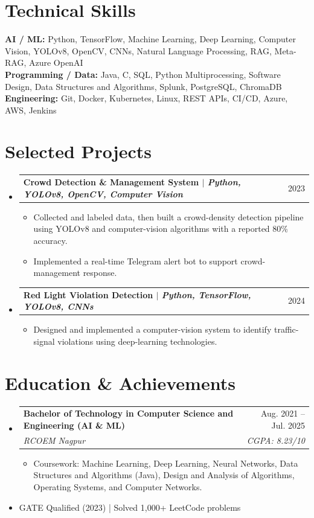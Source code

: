 \documentclass[a4paper,10pt]{article}
\makeatletter
\newcommand{\resumeItem}[1]{\item \small{#1}}
\newcommand{\resumeSubheading}[4]{\item \begin{tabularx}{\textwidth}{@{}Xr@{}}\textbf{#1} & #2 \\ \textit{\small #3} & \textit{\small #4}\end{tabularx}\vspace{-5pt}}
\newcommand{\resumeProjectHeading}[2]{\item \begin{tabularx}{\textwidth}{@{}Xr@{}}\small\textbf{#1} & \small #2\end{tabularx}\vspace{-5pt}}
\makeatother
\begin{document}
\section{Technical Skills}
\small \textbf{AI / ML:} Python, TensorFlow, Machine Learning, Deep Learning, Computer Vision, YOLOv8, OpenCV, CNNs, Natural Language Processing, RAG, Meta-RAG, Azure OpenAI \\
\textbf{Programming / Data:} Java, C, SQL, Python Multiprocessing, Software Design, Data Structures and Algorithms, Splunk, PostgreSQL, ChromaDB \\
\textbf{Engineering:} Git, Docker, Kubernetes, Linux, REST APIs, CI/CD, Azure, AWS, Jenkins

\section{Selected Projects}
\begin{itemize}[leftmargin=0in,label={}]
  \resumeProjectHeading{Crowd Detection \& Management System $|$ \emph{Python, YOLOv8, OpenCV, Computer Vision}}{2023}
  \begin{itemize}
    \resumeItem{Collected and labeled data, then built a crowd-density detection pipeline using YOLOv8 and computer-vision algorithms with a reported 80\% accuracy.}
    \resumeItem{Implemented a real-time Telegram alert bot to support crowd-management response.}
  \end{itemize}
  \resumeProjectHeading{Red Light Violation Detection $|$ \emph{Python, TensorFlow, YOLOv8, CNNs}}{2024}
  \begin{itemize}
    \resumeItem{Designed and implemented a computer-vision system to identify traffic-signal violations using deep-learning technologies.}
  \end{itemize}
\end{itemize}

\section{Education \& Achievements}
\begin{itemize}[leftmargin=0in,label={}]
  \resumeSubheading{Bachelor of Technology in Computer Science and Engineering (AI \& ML)}{Aug. 2021 -- Jul. 2025}{RCOEM Nagpur}{CGPA: 8.23/10}
  \begin{itemize}
    \resumeItem{Coursework: Machine Learning, Deep Learning, Neural Networks, Data Structures and Algorithms (Java), Design and Analysis of Algorithms, Operating Systems, and Computer Networks.}
  \end{itemize}
  \item \small{GATE Qualified (2023) \quad | \quad Solved 1,000+ LeetCode problems}
\end{itemize}
\end{document}
